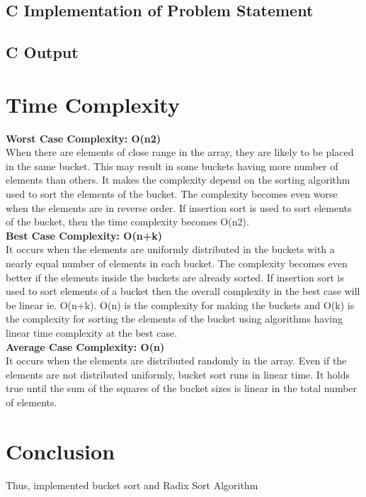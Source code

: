 \documentclass[11pt]{article}
\begin{document}
\subsection{C Implementation of Problem Statement}



\subsection{C Output}


\section{Time Complexity}
\textbf{Worst Case Complexity: O(n2)}\\
When there are elements of close range in the array, they are likely to be placed in the same bucket. This may result in some buckets having more number of elements than others.
It makes the complexity depend on the sorting algorithm used to sort the elements of the bucket.
The complexity becomes even worse when the elements are in reverse order. If insertion sort is used to sort elements of the bucket, then the time complexity becomes O(n2).\\

\noindent
\textbf{Best Case Complexity: O(n+k)}\\
It occurs when the elements are uniformly distributed in the buckets with a nearly equal number of elements in each bucket.
The complexity becomes even better if the elements inside the buckets are already sorted.
If insertion sort is used to sort elements of a bucket then the overall complexity in the best case will be linear ie. O(n+k). O(n) is the complexity for making the buckets and O(k) is the complexity for sorting the elements of the bucket using algorithms having linear time complexity at the best case.\\

\noindent
\textbf{Average Case Complexity: O(n)}\\
It occurs when the elements are distributed randomly in the array. Even if the elements are not distributed uniformly, bucket sort runs in linear time. It holds true until the sum of the squares of the bucket sizes is linear in the total number of elements.

\section{Conclusion}
Thus, implemented bucket sort and Radix Sort Algorithm
\end{document}

